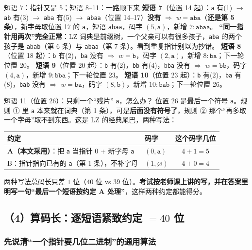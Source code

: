 \documentclass[11pt,a4paper]{ctexart}
\begin{document}
\begin{calc}{短语 7：指针又是 5；短语 8--11：一路顺下来}
\textbf{短语 7}（位置 14 起）：\texttt a 有(1) $\to$ \texttt{ab} 有(3) $\to$ \texttt{aba} 有(5) $\to$ \texttt{abaa}（位置 14--17）\textbf{没有} $\Rightarrow$ $w=\texttt{aba}$（\textbf{还是第 5 条}），新字母取位置 17 的 \texttt a，短语 \texttt{abaa}，码字 $(5,\texttt a)$，新增 $7{:}\texttt{abaa}$。
\textbf{“同一指针用两次”完全正常}：LZ 词典是前缀树，一个父亲可以有很多孩子，\texttt{aba} 的两个孩子是 \texttt{abab}（第 6 条）与 \texttt{abaa}（第 7 条）。看到重复指针别以为抄错。
\textbf{短语 8}（位置 18 起）：\texttt b 有(2)，\texttt{ba} 没有 $\Rightarrow$ $w=\texttt b$，码字 $(2,\texttt a)$，新增 $8{:}\texttt{ba}$；下一轮位置 20。
\textbf{短语 9}（位置 20 起）：\texttt b 有(2)，\texttt{bb} 有(4)，\texttt{bba} 没有 $\Rightarrow$ $w=\texttt{bb}$，码字 $(4,\texttt a)$，新增 $9{:}\texttt{bba}$；下一轮位置 23。
\textbf{短语 10}（位置 23 起）：\texttt b 有(2)，\texttt{ba} 有(8)，\texttt{bab} 没有 $\Rightarrow$ $w=\texttt{ba}$，码字 $(8,\texttt b)$，新增 $10{:}\texttt{bab}$；下一轮位置 26。
\end{calc}

\begin{calc}{短语 11（位置 26）：只剩一个“残片” \texttt a，怎么办？}
位置 26 是最后一个符号 \texttt a。规则 ① 里 \texttt a 本来就在词典（第 1 条），可是\textbf{后面没有符号了}，规则 ② 那个“再多取一个字母”取不到东西。这是 LZ 的经典尾巴，两种写法：
\begin{center}
\small
\begin{tabular}{@{}p{5.6cm}p{4.0cm}c@{}}
\toprule
约定 & 码字 & 这个码字几位 \\
\midrule
\textbf{A（本文采用）}：把 \texttt a 当指针 $0$ + 新字母 \texttt a & $(0,\texttt a)$ & $4+1=5$ \\
B：指针指向已有的 \texttt a（第 1 条），不补字母 & $(1,\varnothing)$ & $4+0=4$ \\
\bottomrule
\end{tabular}
\end{center}
两种写法总码长只差 $1$ 位（$40$ 位 vs $39$ 位）。\textbf{考试按老师课上讲的写，并在答案里明写一句“最后一个短语按约定 A 处理”}，这样两种约定都能得分。
\end{calc}

\subsection{（4）算码长：逐短语紧致约定 $=40$ 位}

\subsubsection{先说清“一个指针要几位二进制”的通用算法}
\end{document}
